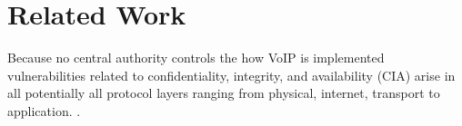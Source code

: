 \section{Related Work}

Because no central authority controls the how VoIP is implemented vulnerabilities related to confidentiality, integrity, and availability (CIA) arise in all potentially all protocol layers ranging from physical, internet, transport to application. \cite{mcgann}. 